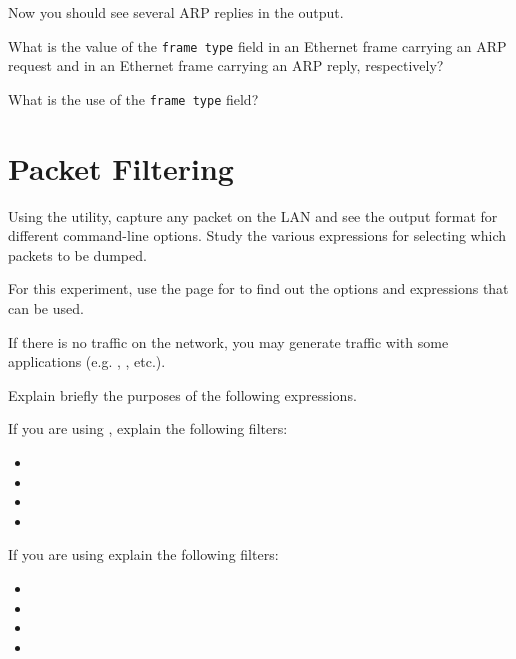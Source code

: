\documentclass{../UTNetLab}
\begin{document}
Now you should see several ARP replies in the  output.

\begin{report}
    \item What is the value of the \texttt{frame type} field in an Ethernet frame carrying an ARP request and in an Ethernet frame carrying an ARP reply, respectively?

    \item What is the use of the \texttt{frame type} field?
\end{report}

\section{Packet Filtering}
Using the  utility, capture any packet on the LAN and see the output format
for different command-line options.
Study the various expressions for selecting
which packets to be dumped.

For this experiment, use the  page for  to find out the options and
expressions that can be used.

If there is no traffic on the network, you may generate traffic with some applications
(e.g. , , etc.).

\begin{report}
    \item Explain briefly the purposes of the following  expressions.
\end{report}

If you are using , explain the following filters:
\begin{itemize}
    \item {}
    \item {}
    \item {}
    \item {}
\end{itemize}

If you are using  explain the following filters:
\begin{itemize}
    \item {}
    \item {}
    \item {}
    \item {}
\end{itemize}
\end{document}
